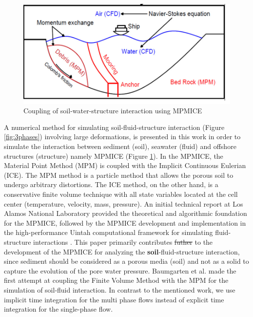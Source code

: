 \documentclass[preprint,12pt]{elsarticle}
\providecommand{\DIFadd}[1]{{\protect\color{blue}\uwave{#1}}} %
\providecommand{\DIFdel}[1]{{\protect\color{red}\sout{#1}}}                      %
\providecommand{\DIFaddbegin}{} %
\providecommand{\DIFaddend}{} %
\providecommand{\DIFdelbegin}{} %
\providecommand{\DIFdelend}{} %
\newcommand{\DIFscaledelfig}{0.5}
\newlength{\DIFdelgraphicswidth} %
\newlength{\DIFdelgraphicsheight} %
\newcommand{\DIFaddincludegraphics}[2][]{{\color{blue}\fbox{\DIFOincludegraphics[#1]{#2}}}} %
\newcommand{\DIFdelincludegraphics}[2][]{%
\sbox{\DIFdelgraphicsbox}{\DIFOincludegraphics[#1]{#2}}%
\settoboxwidth{\DIFdelgraphicswidth}{\DIFdelgraphicsbox} %
\settoboxtotalheight{\DIFdelgraphicsheight}{\DIFdelgraphicsbox} %
\scalebox{\DIFscaledelfig}{%
\parbox[b]{\DIFdelgraphicswidth}{\usebox{\DIFdelgraphicsbox}\\[-\baselineskip] \rule{\DIFdelgraphicswidth}{0em}}\llap{\resizebox{\DIFdelgraphicswidth}{\DIFdelgraphicsheight}{%
\setlength{\unitlength}{\DIFdelgraphicswidth}%
\begin{picture}(1,1)%
\thicklines\linethickness{2pt} %
{\color[rgb]{1,0,0}\put(0,0){\framebox(1,1){}}}%
{\color[rgb]{1,0,0}\put(0,0){\line( 1,1){1}}}%
{\color[rgb]{1,0,0}\put(0,1){\line(1,-1){1}}}%
\end{picture}%
}\hspace*{3pt}}} %
} %
\DeclareRobustCommand{\DIFaddbegin}{\DIFOaddbegin \let\includegraphics\DIFaddincludegraphics} %
\DeclareRobustCommand{\DIFaddend}{\DIFOaddend \let\includegraphics\DIFOincludegraphics} %
\DeclareRobustCommand{\DIFdelbegin}{\DIFOdelbegin \let\includegraphics\DIFdelincludegraphics} %
\DeclareRobustCommand{\DIFdelend}{\DIFOaddend \let\includegraphics\DIFOincludegraphics} %
\begin{document}
%
%
\begin{figure}[h]
\center
\includegraphics[scale=.4]{MPMICE.jpg}
\caption{Coupling of soil-water-structure interaction using MPMICE}
\label{fig:MPMICE}
\end {figure}
%
%

A numerical method for simulating soil-fluid-structure interaction (Figure \ref{fig:3phases}) involving large deformations, is presented in this work in order to simulate the interaction between sediment (soil), seawater (fluid) and offshore structures (structure) namely MPMICE (Figure \ref{fig:MPMICE}). In the MPMICE, the Material Point Method (MPM) is coupled with the Implicit Continuous Eulerian (ICE). The MPM method is a particle method that allows the porous soil to undergo arbitrary distortions. The ICE method, on the other hand, is a conservative finite volume technique with all state variables located at the cell center (temperature, velocity, mass, pressure). An initial technical report \cite{Kashiwa} at Los Alamos National Laboratory provided the theoretical and algorithmic foundation for the MPMICE, followed by the MPMICE development and implementation in the high-performance Uintah computational framework for simulating fluid-structure interactions \cite{MPMICE}. This paper primarily contributes \DIFdelbegin \DIFdel{futher }\DIFdelend \DIFaddbegin \DIFadd{further }\DIFaddend to the development of the MPMICE for analyzing the \textbf{soil}-fluid-structure interaction, since sediment should be considered as a porous media (soil) and not as a solid to capture the evolution of the pore water pressure. Baumgarten et al. \cite{Baumgarten2021} made the first attempt at coupling the Finite Volume Method with the MPM for the simulation of soil-fluid interaction. In contrast to the mentioned work, we use implicit time integration for the multi phase flows instead of explicit time integration for the single-phase flow.
\end{document}
